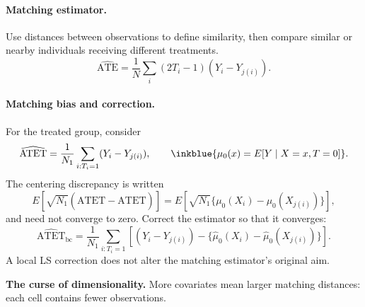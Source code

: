 {\paragraph{Matching estimator.}
Use distances between observations to define similarity, then compare similar or nearby individuals receiving different treatments.  
\[\widehat{\mathrm{ATE}}=\frac1N\sum_i(2T_i-1)(Y_i-Y_{j(i)}).\]
 

\paragraph{Matching bias and correction.}
For the treated group, consider
\[\widehat{\mathrm{ATET}}=\frac1{N_1}\sum_{i:T_i=1}(Y_i-Y_{j(i)}),\qquad
\inkblue{\mu_0(x)=E[Y\mid X=x,T=0]}.\]
The centering discrepancy is written
\[E[\sqrt{N_1}(\widehat{\mathrm{ATET}}-\mathrm{ATET})]
=E[\sqrt{N_1}\{\mu_0(X_i)-\mu_0(X_{j(i)})\}],\]
and need not converge to zero.   Correct the estimator so that it converges:
\[\widehat{\mathrm{ATET}}_{\mathrm{bc}}=
\frac1{N_1}\sum_{i:T_i=1}\left[(Y_i-Y_{j(i)})-
\{\hat\mu_0(X_i)-\hat\mu_0(X_{j(i)})\}\right].\]
 A local LS correction does not alter the matching estimator's original aim.

\textbf{The curse of dimensionality.} More covariates mean larger matching distances: each cell contains fewer observations.

}
